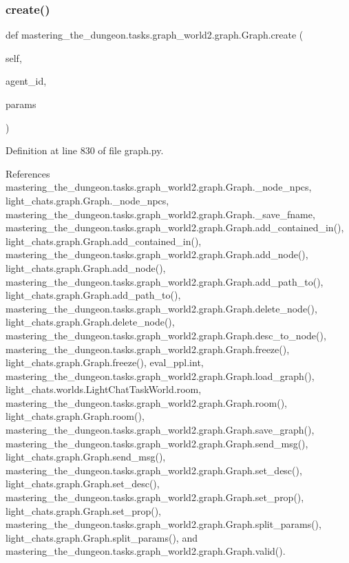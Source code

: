 \subsubsection{\texorpdfstring{create()}{create()}}
{\footnotesize\ttfamily def mastering\+\_\+the\+\_\+dungeon.\+tasks.\+graph\+\_\+world2.\+graph.\+Graph.\+create (\begin{DoxyParamCaption}\item[{}]{self,  }\item[{}]{agent\+\_\+id,  }\item[{}]{params }\end{DoxyParamCaption})}



Definition at line 830 of file graph.\+py.



References mastering\+\_\+the\+\_\+dungeon.\+tasks.\+graph\+\_\+world2.\+graph.\+Graph.\+\_\+node\+\_\+npcs, light\+\_\+chats.\+graph.\+Graph.\+\_\+node\+\_\+npcs, mastering\+\_\+the\+\_\+dungeon.\+tasks.\+graph\+\_\+world2.\+graph.\+Graph.\+\_\+save\+\_\+fname, mastering\+\_\+the\+\_\+dungeon.\+tasks.\+graph\+\_\+world2.\+graph.\+Graph.\+add\+\_\+contained\+\_\+in(), light\+\_\+chats.\+graph.\+Graph.\+add\+\_\+contained\+\_\+in(), mastering\+\_\+the\+\_\+dungeon.\+tasks.\+graph\+\_\+world2.\+graph.\+Graph.\+add\+\_\+node(), light\+\_\+chats.\+graph.\+Graph.\+add\+\_\+node(), mastering\+\_\+the\+\_\+dungeon.\+tasks.\+graph\+\_\+world2.\+graph.\+Graph.\+add\+\_\+path\+\_\+to(), light\+\_\+chats.\+graph.\+Graph.\+add\+\_\+path\+\_\+to(), mastering\+\_\+the\+\_\+dungeon.\+tasks.\+graph\+\_\+world2.\+graph.\+Graph.\+delete\+\_\+node(), light\+\_\+chats.\+graph.\+Graph.\+delete\+\_\+node(), mastering\+\_\+the\+\_\+dungeon.\+tasks.\+graph\+\_\+world2.\+graph.\+Graph.\+desc\+\_\+to\+\_\+node(), mastering\+\_\+the\+\_\+dungeon.\+tasks.\+graph\+\_\+world2.\+graph.\+Graph.\+freeze(), light\+\_\+chats.\+graph.\+Graph.\+freeze(), eval\+\_\+ppl.\+int, mastering\+\_\+the\+\_\+dungeon.\+tasks.\+graph\+\_\+world2.\+graph.\+Graph.\+load\+\_\+graph(), light\+\_\+chats.\+worlds.\+Light\+Chat\+Task\+World.\+room, mastering\+\_\+the\+\_\+dungeon.\+tasks.\+graph\+\_\+world2.\+graph.\+Graph.\+room(), light\+\_\+chats.\+graph.\+Graph.\+room(), mastering\+\_\+the\+\_\+dungeon.\+tasks.\+graph\+\_\+world2.\+graph.\+Graph.\+save\+\_\+graph(), mastering\+\_\+the\+\_\+dungeon.\+tasks.\+graph\+\_\+world2.\+graph.\+Graph.\+send\+\_\+msg(), light\+\_\+chats.\+graph.\+Graph.\+send\+\_\+msg(), mastering\+\_\+the\+\_\+dungeon.\+tasks.\+graph\+\_\+world2.\+graph.\+Graph.\+set\+\_\+desc(), light\+\_\+chats.\+graph.\+Graph.\+set\+\_\+desc(), mastering\+\_\+the\+\_\+dungeon.\+tasks.\+graph\+\_\+world2.\+graph.\+Graph.\+set\+\_\+prop(), light\+\_\+chats.\+graph.\+Graph.\+set\+\_\+prop(), mastering\+\_\+the\+\_\+dungeon.\+tasks.\+graph\+\_\+world2.\+graph.\+Graph.\+split\+\_\+params(), light\+\_\+chats.\+graph.\+Graph.\+split\+\_\+params(), and mastering\+\_\+the\+\_\+dungeon.\+tasks.\+graph\+\_\+world2.\+graph.\+Graph.\+valid().



